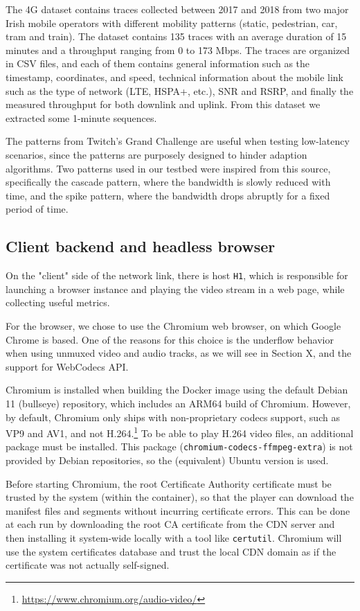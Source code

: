 The 4G dataset contains traces collected between 2017 and 2018 from two major Irish mobile operators with different mobility patterns (static, pedestrian, car, tram and train). The dataset contains 135 traces with an average duration of 15 minutes and a throughput ranging from 0 to 173 Mbps. The traces are organized in CSV files, and each of them contains general information such as the timestamp, coordinates, and speed, technical information about the mobile link such as the type of network (LTE, HSPA+, etc.), SNR and RSRP, and finally the measured throughput for both downlink and uplink. From this dataset we extracted some 1-minute sequences. %

The patterns from Twitch's Grand Challenge are useful when testing low-latency scenarios, since the patterns are purposely designed to hinder adaption algorithms. Two patterns used in our testbed were inspired from this source, specifically the cascade pattern, where the bandwidth is slowly reduced with time, and the spike pattern, where the bandwidth drops abruptly for a fixed period of time.

\subsection{Client backend and headless browser}
\label{sec:eval/testbed/backend}

On the "client" side of the network link, there is host \texttt{H1}, which is responsible for launching a browser instance and playing the video stream in a web page, while collecting useful metrics.

For the browser, we chose to use the Chromium web browser, on which Google Chrome is based. One of the reasons for this choice is the underflow behavior when using unmuxed video and audio tracks, as we will see in Section X, and the support for WebCodecs API.

Chromium is installed when building the Docker image using the default Debian 11 (bullseye) repository, which includes an ARM64 build of Chromium. However, by default, Chromium only ships with non-proprietary codecs support, such as VP9 and AV1, and not H.264.\footnote{\url{https://www.chromium.org/audio-video/}} To be able to play H.264 video files, an additional package must be installed. This package (\texttt{chromium-codecs-ffmpeg-extra}) is not provided by Debian repositories, so the (equivalent) Ubuntu version is used.

Before starting Chromium, the root Certificate Authority certificate must be trusted by the system (within the container), so that the player can download the manifest files and segments without incurring certificate errors. This can be done at each run by downloading the root CA certificate from the CDN server and then installing it system-wide locally with a tool like \texttt{certutil}. Chromium will use the system certificates database and trust the local CDN domain as if the certificate was not actually self-signed.

